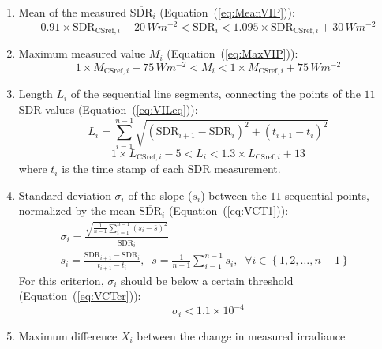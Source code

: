 \documentclass[applsci,article,submit,moreauthors,pdftex]{Definitions/mdpi}
\providecommand{\tightlist}{%
  \setlength{\itemsep}{0pt}\setlength{\parskip}{0pt}}
\begin{document}
\begin{enumerate}
\def\labelenumi{(\alph{enumi})}
\tightlist
\item
  Mean of the measured \(\overline{\text{SDR}}_i\)
  (Equation~(\ref{eq:MeanVIP})): \begin{equation}
  0.91 \times \overline{\text{SDR}}_{\text{CSref},i} - 20\,Wm^{-2}
  < \overline{\text{SDR}}_i <
  1.095 \times \overline{\text{SDR}}_{\text{CSref},i} + 30\,Wm^{-2}
  \label{eq:MeanVIP}
  \end{equation}
\item
  Maximum measured value \(M_{i}\) (Equation~(\ref{eq:MaxVIP})):
  \begin{equation}
  1 \times M_{\text{CSref},i} - 75\,Wm^{-2}
  < M_{i} <
  1 \times M_{\text{CSref},i} + 75\,Wm^{-2}
  \label{eq:MaxVIP}
  \end{equation}
\item
  Length \(L_i\) of the sequential line segments, connecting the points
  of the \(11\) SDR values (Equation~(\ref{eq:VILeq})): \begin{equation}
  L_i = \sum_{i=1}^{n-1}\sqrt{\left ( \text{SDR}_{i+1} - \text{SDR}_{i}\right )^2 + \left ( t_{i+1} - t_i \right )^2}
  \label{eq:VILeq}
  \end{equation} \begin{equation}
  1 \times L_{\text{CSref},i} - 5 < L_i < 1.3 \times L_{\text{CSref},i} + 13
  \label{eq:VILcr}
  \end{equation} where \(t_i\) is the time stamp of each SDR
  measurement.
\item
  Standard deviation \(\sigma_i\) of the slope (\(s_i\)) between the
  \(11\) sequential points, normalized by the mean
  \(\overline{\text{SDR}}_i\) (Equation~(\ref{eq:VCT1})): \begin{gather}
    \sigma_i = \frac {\sqrt{\frac{1}{n-1} \sum_{i=1}^{n-1} \left( s_i - \bar{s} \right)^2}} {\overline{\text{SDR}}_i} \label{eq:VCT1} \\
    s_i = \frac{\text{SDR}_{i+1} - \text{SDR}_{i}}{t_{i+1} - t_i},\;\;   \bar{s} = \frac{1}{n-1} \sum_{i=1}^{n-1} s_i,\;\;\forall i \in \left \{ 1, 2, \ldots, n-1 \right \}\;\;
  \end{gather} For this criterion, \(\sigma_i\) should be below a
  certain threshold (Equation~(\ref{eq:VCTcr})): \begin{equation}
    \sigma_i < \ensuremath{1.1\times 10^{-4}} \label{eq:VCTcr}
  \end{equation}
\item
  Maximum difference \(X_i\) between the change in measured irradiance

\end{enumerate}
\end{document}
